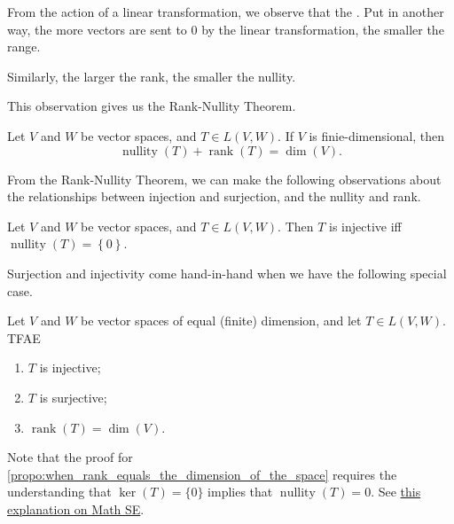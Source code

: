 \documentclass[notoc,notitlepage]{tufte-book}
\DeclareMathOperator{\nullity}{nullity}
\DeclareMathOperator{\rank}{rank}
\begin{document}
\begin{note}
  From the action of a linear transformation,
  we observe that the .
  Put in another way, the more vectors are sent to $0$ by the linear transformation,
  the smaller the range.

  Similarly, the larger the rank, the smaller the nullity.
\end{note}

This observation gives us the Rank-Nullity Theorem.

\begin{thm}\label{thm:rank_nullity_theorem}
  Let $V$ and $W$ be vector spaces, and $T \in L(V, W)$. If $V$ is finie-dimensional, then
  \begin{equation*}
    \nullity(T) + \rank(T) = \dim (V).
  \end{equation*}
\end{thm}

From the Rank-Nullity Theorem,
we can make the following observations about the relationships
between injection and surjection, and the nullity and rank.

\begin{propo}\label{propo:nullity_of_only_0_and_injectivity}
  Let $V$ and $W$ be vector spaces, and $T \in L(V, W)$.
  Then $T$ is injective iff $\nullity(T) = \left\{ 0 \right\}$.
\end{propo}

Surjection and injectivity come hand-in-hand when
we have the following special case.

\begin{propo}\label{propo:when_rank_equals_the_dimension_of_the_space}
  Let $V$ and $W$ be vector spaces of equal (finite) dimension,
  and let $T \in L(V, W)$. TFAE
  \begin{enumerate}
    \item $T$ is injective;
    \item $T$ is surjective;
    \item $\rank(T) = \dim(V)$.
  \end{enumerate}
\end{propo}

Note that the proof for \cref{propo:when_rank_equals_the_dimension_of_the_space}
requires the understanding that $\ker(T) = \{ 0 \}$ implies that $\nullity(T) = 0$.
See \href{https://math.stackexchange.com/questions/664594/why-mathbf0-has-dimension-zero}{this explanation on Math SE}.
\end{document}
